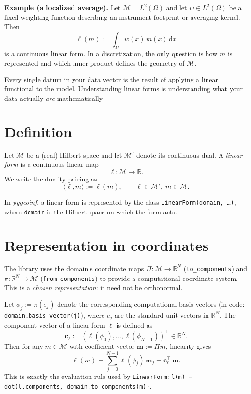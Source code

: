 \documentclass[11pt,twoside,openright]{book}
\theoremstyle{plain}
\theoremstyle{definition}
\theoremstyle{remark}
\newcommand{\modelspace}{\mathcal{M}}
\newcommand{\pair}[2]{\langle #1, #2\rangle}
\begin{document}
\begin{examplebox}
\textbf{Example (a localized average).}
Let $\modelspace=L^2(\Omega)$ and let $w\in L^2(\Omega)$ be a fixed weighting
function describing an instrument footprint or averaging kernel.
Then
\[
  \ell(m) := \int_\Omega w(x)\,m(x)\,\mathrm{d}x
\]
is a continuous linear form.
In a discretization, the only question is how $m$ is represented and which
inner product defines the geometry of $\modelspace$.
\end{examplebox}

\begin{whybox}
Every single datum in your data vector is the result of applying a
linear functional to the model. Understanding linear forms is
understanding what your data actually \emph{are} mathematically.
\end{whybox}

\section{Definition}
\label{sec:form-definition}

Let $\modelspace$ be a (real) Hilbert space and let $\modelspace'$ denote its
continuous dual.
A \emph{linear form} is a continuous linear map
\[
  \ell : \modelspace \to \mathbb{R}.
\]
We write the duality pairing as
\[
  \pair{\ell}{m} := \ell(m), \qquad \ell\in\modelspace',\; m\in\modelspace.
\]

In \textit{pygeoinf}, a linear form is represented by the class
\texttt{LinearForm(domain, \ldots)}, where \texttt{domain} is the Hilbert space
on which the form acts.

\section{Representation in coordinates}
\label{sec:form-coordinates}

The library uses the domain's coordinate maps
$\Pi:\modelspace\to\mathbb{R}^N$ (\texttt{to\_components}) and
$\pi:\mathbb{R}^N\to\modelspace$ (\texttt{from\_components}) to provide a
computational coordinate system.
This is a \emph{chosen representation}: it need not be orthonormal.

Let $\phi_j := \pi(e_j)$ denote the corresponding computational basis vectors
(in code: \texttt{domain.basis\_vector(j)}), where $e_j$ are the standard unit
vectors in $\mathbb{R}^N$.
The component vector of a linear form $\ell$ is defined as
\[
  \mathbf{c}_\ell := (\ell(\phi_0),\ldots,\ell(\phi_{N-1}))^\top \in \mathbb{R}^N.
\]
Then for any $m\in\modelspace$ with coefficient vector $\mathbf{m}:=\Pi m$,
linearity gives
\[
  \ell(m) = \sum_{j=0}^{N-1} \ell(\phi_j)\,\mathbf{m}_j
  = \mathbf{c}_\ell^\top\,\mathbf{m}.
\]
This is exactly the evaluation rule used by \texttt{LinearForm}:
\texttt{l(m) = dot(l.components, domain.to\_components(m))}.
\end{document}
